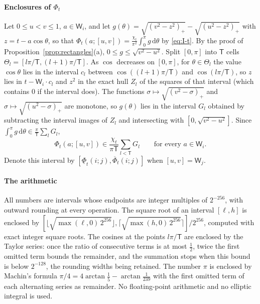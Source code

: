 \documentclass[preprint,12pt,a4paper]{elsarticle}
\theoremstyle{remark}
\newcommand{\dd}{\,\mathrm d}
\begin{document}
\paragraph{Enclosures of $\Phi_t$}
Let $0\le u<v\le1$, $a\in \mathsf W_i$, and let $g(\theta)=\sqrt{(v^2-z^2)_+}-\sqrt{(u^2-z^2)_+}$ with
$z=t-a\cos\theta$, so that $\Phi_t(a;[u,v])=\frac{\chi_t}{\pi^2}\int_0^\pi g\dd\theta$ by
\eqref{eq:I-t}. By the proof of Proposition~\ref{prop:rectangles}(a),
$0\le g\le\sqrt{v^2-u^2}$. Split $[0,\pi]$ into $\mathsf T$ cells
$\Theta_l=[l\pi/\mathsf T,(l+1)\pi/\mathsf T]$. As $\cos$ decreases on $[0,\pi]$, for $\theta\in\Theta_l$
the value $\cos\theta$ lies in the interval $c_l$ between $\cos((l+1)\pi/\mathsf T)$ and
$\cos(l\pi/\mathsf T)$, so $z$ lies in $t-\mathsf W_i\cdot c_l$ and $z^2$ in the exact hull $Z_l$ of the squares of
that interval (which contains $0$ if the interval does). The functions $\sigma\mapsto\sqrt{(v^2-\sigma)_+}$
and $\sigma\mapsto\sqrt{(u^2-\sigma)_+}$ are monotone, so $g(\theta)$ lies in the interval $G_l$
obtained by subtracting the interval images of $Z_l$ and intersecting with $[0,\sqrt{v^2-u^2}]$. Since
$\int_0^\pi g\dd\theta\in\frac\pi{\mathsf T}\sum_lG_l$,
\begin{equation}\label{eq:I-enclosure}
 \Phi_t(a;[u,v])\in\frac{\chi_t}{\pi\mathsf T}\sum_{l<\mathsf T}G_l\qquad\text{for every }a\in \mathsf W_i .
\end{equation}
Denote this interval by $[\underline \Phi_t(i;j),\overline \Phi_t(i;j)]$ when $[u,v]=\mathsf W_j$.

\paragraph{The arithmetic}
All numbers are intervals whose endpoints are integer multiples of $2^{-256}$, with outward
rounding at every operation. The square root of an interval $[\ell,h]$ is enclosed by
$[\lfloor\sqrt{\max(\ell,0)\,2^{256}}\rfloor,\lceil\sqrt{\max(h,0)\,2^{256}}\rceil]/2^{256}$,
computed with exact integer square roots. The cosines at the points $l\pi/\mathsf T$ are enclosed
by the Taylor series: once the ratio of consecutive terms is at most $\frac12$, twice the first
omitted term bounds the remainder, and the summation stops when this bound is below $2^{-128}$,
the rounding widths being retained. The number $\pi$ is enclosed by
Machin's formula $\pi/4=4\arctan\frac15-\arctan\frac1{239}$ with the first omitted term of each
alternating series as remainder. No floating-point arithmetic and no elliptic integral is used.
\end{document}

